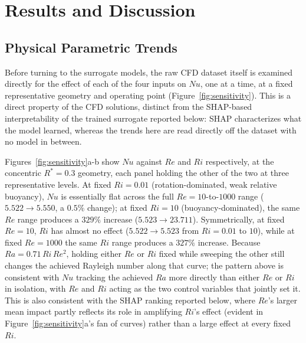 \section{Results and Discussion}
\label{sec:results}

\subsection{Physical Parametric Trends}
\label{subsec:physical_trends}

Before turning to the surrogate models, the raw CFD dataset itself is examined directly for the effect of each of the four inputs on $Nu$, one at a time, at a fixed representative geometry and operating point (Figure~\ref{fig:sensitivity}). This is a direct property of the CFD solutions, distinct from the SHAP-based interpretability of the trained surrogate reported below: SHAP characterizes what the model learned, whereas the trends here are read directly off the dataset with no model in between.

Figures~\ref{fig:sensitivity}a-b show $Nu$ against $Re$ and $Ri$ respectively, at the concentric $R^\ast=0.3$ geometry, each panel holding the other of the two at three representative levels. At fixed $Ri=0.01$ (rotation-dominated, weak relative buoyancy), $Nu$ is essentially flat across the full $Re=10$-to-$1000$ range ($5.522\to5.550$, a $0.5\%$ change); at fixed $Ri=10$ (buoyancy-dominated), the same $Re$ range produces a $329\%$ increase ($5.523\to23.711$). Symmetrically, at fixed $Re=10$, $Ri$ has almost no effect ($5.522\to5.523$ from $Ri=0.01$ to $10$), while at fixed $Re=1000$ the same $Ri$ range produces a $327\%$ increase. Because $Ra=0.71\,Ri\,Re^2$, holding either $Re$ or $Ri$ fixed while sweeping the other still changes the achieved Rayleigh number along that curve; the pattern above is consistent with $Nu$ tracking the achieved $Ra$ more directly than either $Re$ or $Ri$ in isolation, with $Re$ and $Ri$ acting as the two control variables that jointly set it. This is also consistent with the SHAP ranking reported below, where $Re$'s larger mean impact partly reflects its role in amplifying $Ri$'s effect (evident in Figure~\ref{fig:sensitivity}a's fan of curves) rather than a large effect at every fixed $Ri$.

